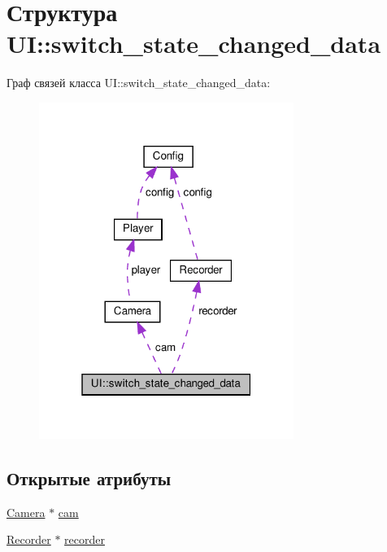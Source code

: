 \hypertarget{struct_u_i_1_1switch__state__changed__data}{}\section{Структура UI\+:\+:switch\+\_\+state\+\_\+changed\+\_\+data}
\label{struct_u_i_1_1switch__state__changed__data}


Граф связей класса UI\+:\+:switch\+\_\+state\+\_\+changed\+\_\+data\+:\nopagebreak
\begin{figure}[H]
\begin{center}
\leavevmode
\includegraphics[width=235pt]{struct_u_i_1_1switch__state__changed__data__coll__graph}
\end{center}
\end{figure}
\subsection*{Открытые атрибуты}
\begin{DoxyCompactItemize}
\item 
\hyperlink{struct_camera}{Camera} $\ast$ \hyperlink{struct_u_i_1_1switch__state__changed__data_a40244e7ca16845eb02f4f7315ae98a89}{cam}
\item 
\hyperlink{class_recorder}{Recorder} $\ast$ \hyperlink{struct_u_i_1_1switch__state__changed__data_a9d4666f9a5533060e0a1ce07d74a240f}{recorder}
\end{DoxyCompactItemize}


